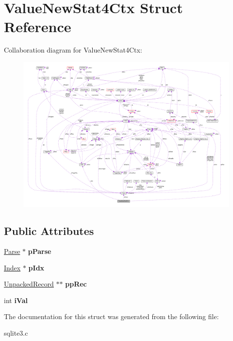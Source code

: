 \hypertarget{structValueNewStat4Ctx}{}\section{Value\+New\+Stat4\+Ctx Struct Reference}
\label{structValueNewStat4Ctx}


Collaboration diagram for Value\+New\+Stat4\+Ctx\+:\nopagebreak
\begin{figure}[H]
\begin{center}
\leavevmode
\includegraphics[width=350pt]{structValueNewStat4Ctx__coll__graph}
\end{center}
\end{figure}
\subsection*{Public Attributes}
\begin{DoxyCompactItemize}
\item 
\hyperlink{structParse}{Parse} $\ast$ {\bfseries p\+Parse}\hypertarget{structValueNewStat4Ctx_aa1d5c751a45f4e608dbd883179dd2f18}{}\label{structValueNewStat4Ctx_aa1d5c751a45f4e608dbd883179dd2f18}

\item 
\hyperlink{structIndex}{Index} $\ast$ {\bfseries p\+Idx}\hypertarget{structValueNewStat4Ctx_a31a0ab3baf8fab451df095591408acad}{}\label{structValueNewStat4Ctx_a31a0ab3baf8fab451df095591408acad}

\item 
\hyperlink{structUnpackedRecord}{Unpacked\+Record} $\ast$$\ast$ {\bfseries pp\+Rec}\hypertarget{structValueNewStat4Ctx_a64e1490828ea95f9edc650a776a121d9}{}\label{structValueNewStat4Ctx_a64e1490828ea95f9edc650a776a121d9}

\item 
int {\bfseries i\+Val}\hypertarget{structValueNewStat4Ctx_a54d56872d3653e59a00a91ea1c6b7664}{}\label{structValueNewStat4Ctx_a54d56872d3653e59a00a91ea1c6b7664}

\end{DoxyCompactItemize}


The documentation for this struct was generated from the following file\+:\begin{DoxyCompactItemize}
\item 
sqlite3.\+c\end{DoxyCompactItemize}
